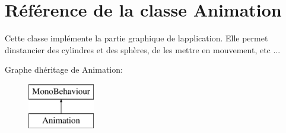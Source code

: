 \hypertarget{class_animation}{}\section{Référence de la classe Animation}
\label{class_animation}


Cette classe implémente la partie graphique de l\textquotesingle{}application. Elle permet d\textquotesingle{}instancier des cylindres et des sphères, de les mettre en mouvement, etc ...  


Graphe d\textquotesingle{}héritage de Animation\+:\begin{figure}[H]
\begin{center}
\leavevmode
\includegraphics[height=2.000000cm]{class_animation}
\end{center}
\end{figure}

